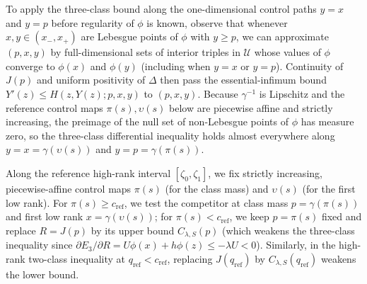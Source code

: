 \documentclass[11pt]{article}
\numberwithin{equation}{section}
\theoremstyle{plain}
\theoremstyle{definition}
\newcommand{\1}{\mathbf{1}}
\newcommand{\calU}{\mathcal{U}}
\begin{document}
To apply the three-class bound along the one-dimensional control paths $y = x$ and $y = p$ before regularity of $\phi$ is known, observe that whenever $x, y \in (x_-, x_+)$ are Lebesgue points of $\phi$ with $y \ge p$, we can approximate $(p, x, y)$ by full-dimensional sets of interior triples in $\calU$ whose values of $\phi$ converge to $\phi(x)$ and $\phi(y)$ (including when $y = x$ or $y = p$). Continuity of $J(p)$ and uniform positivity of $\Delta$ then pass the essential-infimum bound $Y'(z) \le H(z, Y(z); p, x, y)$ to $(p, x, y)$. Because $\gamma^{-1}$ is Lipschitz and the reference control maps $\pi(s), \upsilon(s)$ below are piecewise affine and strictly increasing, the preimage of the null set of non-Lebesgue points of $\phi$ has measure zero, so the three-class differential inequality holds almost everywhere along $y = x = \gamma(\upsilon(s))$ and $y = p = \gamma(\pi(s))$.

Along the reference high-rank interval $[\zeta_0, \zeta_1]$, we fix strictly increasing, piecewise-affine control maps $\pi(s)$ (for the class mass) and $\upsilon(s)$ (for the first low rank). For $\pi(s) \ge c_{\mathrm{ref}}$, we test the competitor at class mass $p = \gamma(\pi(s))$ and first low rank $x = \gamma(\upsilon(s))$; for $\pi(s) < c_{\mathrm{ref}}$, we keep $p = \pi(s)$ fixed and replace $R = J(p)$ by its upper bound $C_{\lambda, S}(p)$ (which weakens the three-class inequality since $\partial E_3/\partial R = U\phi(x) + h\phi(z) \le -\lambda U < 0$). Similarly, in the high-rank two-class inequality at $q_{\mathrm{ref}} < c_{\mathrm{ref}}$, replacing $J(q_{\mathrm{ref}})$ by $C_{\lambda, S}(q_{\mathrm{ref}})$ weakens the lower bound.
\end{document}
